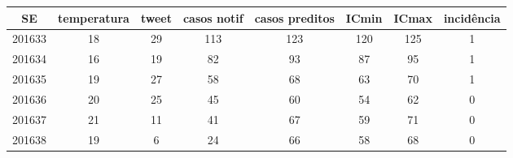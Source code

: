 \begin{tabular}{c|ccccccc}
  \hline
SE & temperatura & tweet & casos notif & casos preditos & ICmin & ICmax & incidência \\ 
  \hline
201633 & 18 & 29 & 113 & 123 & 120 & 125 & 1 \\ 
  201634 & 16 & 19 & 82 & 93 & 87 & 95 & 1 \\ 
  201635 & 19 & 27 & 58 & 68 & 63 & 70 & 1 \\ 
  201636 & 20 & 25 & 45 & 60 & 54 & 62 & 0 \\ 
  201637 & 21 & 11 & 41 & 67 & 59 & 71 & 0 \\ 
  201638 & 19 & 6 & 24 & 66 & 58 & 68 & 0 \\ 
   \hline
\end{tabular}
